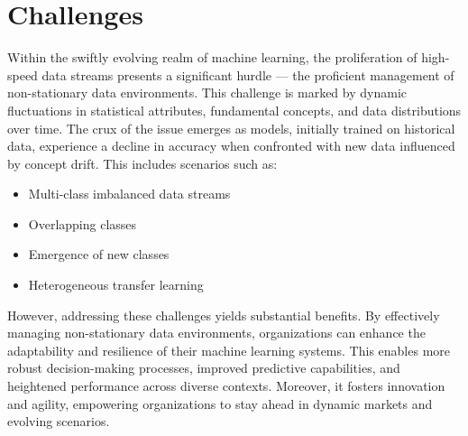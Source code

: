 \section{Challenges}
\label{sec:1_introduction_challange}
Within the swiftly evolving realm of machine learning, the proliferation of high-speed data streams presents a significant hurdle — the proficient management of non-stationary data environments. This challenge is marked by dynamic fluctuations in statistical attributes, fundamental concepts, and data distributions over time. The crux of the issue emerges as models, initially trained on historical data, experience a decline in accuracy when confronted with new data influenced by concept drift. This includes scenarios such as:
\begin{itemize}
    \setlength{\itemsep}{0pt}
    \setlength{\parskip}{0pt}
    \item Multi-class imbalanced data streams
    \item Overlapping classes
    \item Emergence of new classes
    \item Heterogeneous transfer learning
\end{itemize}
However, addressing these challenges yields substantial benefits. By effectively managing non-stationary data environments, organizations can enhance the adaptability and resilience of their machine learning systems. This enables more robust decision-making processes, improved predictive capabilities, and heightened performance across diverse contexts. Moreover, it fosters innovation and agility, empowering organizations to stay ahead in dynamic markets and evolving scenarios.